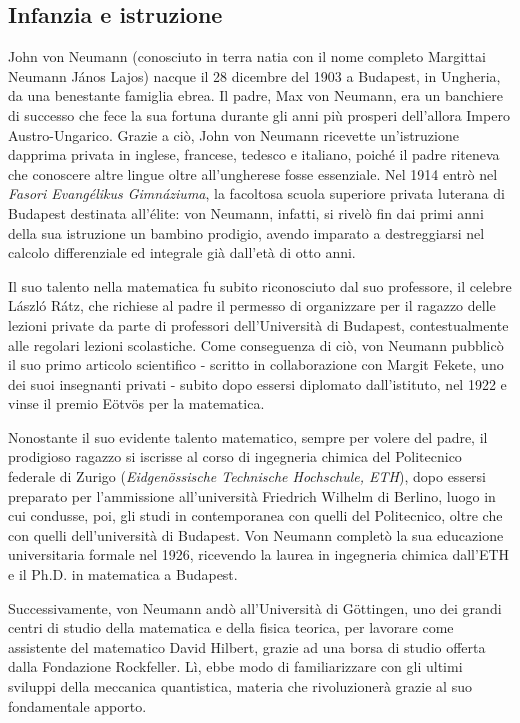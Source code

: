 \documentclass[a4paper, 12pt]{article}
\begin{document}

\subsection{Infanzia e istruzione} %

John von Neumann (conosciuto in terra natia con il nome completo Margittai Neumann János Lajos) nacque il 28 dicembre del 1903 a Budapest, in Ungheria, da una benestante famiglia ebrea. Il padre, Max von Neumann, era un banchiere di successo che fece la sua fortuna durante gli anni più prosperi dell'allora Impero Austro-Ungarico. Grazie a ciò, John von Neumann ricevette un'istruzione dapprima privata in inglese, francese, tedesco e italiano, poiché il padre riteneva che conoscere altre lingue oltre all'ungherese fosse essenziale. Nel 1914 entrò nel \textit{Fasori Evangélikus Gimnáziuma}, la facoltosa scuola superiore privata luterana di Budapest destinata all'élite: von Neumann, infatti, si rivelò fin dai primi anni della sua istruzione un bambino prodigio, avendo imparato a destreggiarsi nel calcolo differenziale ed integrale già dall'età di otto anni. 

Il suo talento nella matematica fu subito riconosciuto dal suo professore, il celebre László Rátz, che richiese al padre il permesso di organizzare per il ragazzo delle lezioni private da parte di professori dell'Università di Budapest, contestualmente alle regolari lezioni scolastiche. Come conseguenza di ciò, von Neumann pubblicò il suo primo articolo scientifico - scritto in collaborazione con Margit Fekete, uno dei suoi insegnanti privati - subito dopo essersi diplomato dall'istituto, nel 1922 e vinse il premio Eötvös per la matematica.

Nonostante il suo evidente talento matematico, sempre per volere del padre, il prodigioso ragazzo si iscrisse al corso di ingegneria chimica del Politecnico federale di Zurigo (\textit{Eidgenössische Technische Hochschule, ETH}), dopo essersi preparato per l'ammissione all'università Friedrich Wilhelm di Berlino, luogo in cui condusse, poi, gli studi in contemporanea con quelli del Politecnico, oltre che con quelli dell'università di Budapest. Von Neumann completò la sua educazione universitaria formale nel 1926, ricevendo la laurea in ingegneria chimica dall'ETH e il Ph.D. in matematica a Budapest.

Successivamente, von Neumann andò all'Università di Göttingen, uno dei grandi centri di studio della matematica e della fisica teorica, per lavorare come assistente del matematico David Hilbert, grazie ad una borsa di studio offerta dalla Fondazione Rockfeller. Lì, ebbe modo di familiarizzare con gli ultimi sviluppi della meccanica quantistica, materia che rivoluzionerà grazie al suo fondamentale apporto.
\end{document}
